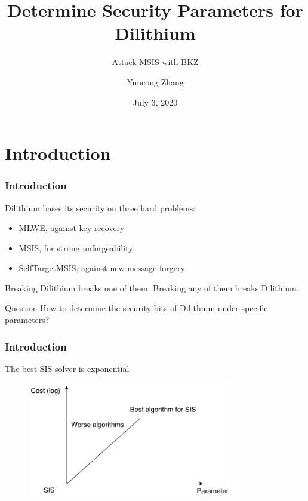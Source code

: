 \documentclass{beamer}
\title{Determine Security Parameters for Dilithium}
\subtitle{Attack MSIS with BKZ}
\author{Yuncong Zhang}
\date{July 3, 2020}
\begin{document}
\frame{\titlepage}


\section{Introduction}
\frame
{
  \frametitle{Introduction}

  Dilithium bases its security on three hard problems:

  \begin{itemize}
  	\item MLWE, against key recovery
  	\item MSIS, for strong unforgeability
  	\item SelfTargetMSIS, against new message forgery
  \end{itemize}

  Breaking Dilithium breaks one of them.
  Breaking any of them breaks Dilithium.

  \begin{block}{Question}
  How to determine the security bits of Dilithium under specific parameters?
  \end{block}
}

%
%

\frame
{
  \frametitle{Introduction}

  The best SIS solver is exponential

  \begin{figure}[ht!]
  \includegraphics[width=0.8\textwidth]{files/SIS-Solvers.pdf}
  \end{figure}
}
\end{document}
